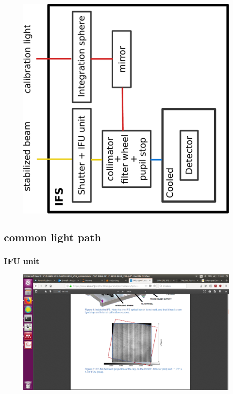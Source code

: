 \documentclass[twoside,single]{lion-msc}
\begin{document}
\begin{figure}[htbp]
\centering 
\includegraphics[trim={13cm 5cm 10cm 7cm},clip,scale = 0.47]{overviewIFS}
\caption{} 
\label{}
\end{figure}

\subsection{common light path}


\subsubsection{IFU unit}

\begin{figure}[htbp]
\centering 
\includegraphics[trim={15cm 5.5cm 10cm 9.5cm},clip,scale = 0.47]{biggre}
\caption{} 
\label{}
\end{figure}
\end{document}

